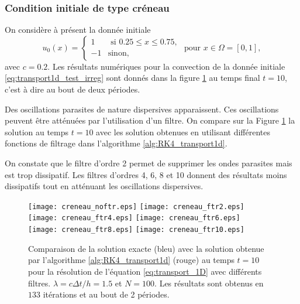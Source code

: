 \subsubsection{Condition initiale de type créneau}

On considère à présent la donnée initiale
\begin{equation}
u_0(x) = \left\lbrace
\begin{array}{rl}
1 & \text{ si } 0.25 \leq x \leq 0.75, \\
-1 & \text{sinon,}
\end{array}
\right.
\text{ pour } x \in \Omega = [0,1],
\label{eq:transport1d_test_irreg}
\end{equation}
avec $c=0.2$. Les résultats numériques pour la convection de la donnée initiale \eqref{eq:transport1d_test_irreg} sont donnés dans la figure \ref{fig:comp_ireg} au temps final $t=10$, c'est à dire au bout de deux périodes.

Des oscillations parasites de nature dispersives apparaissent. Ces oscillations peuvent être atténuées par l'utilisation d'un filtre. On compare sur la Figure \ref{fig:comp_ireg} la solution au temps $t=10$ avec les solution obtenues en utilisant différentes fonctions de filtrage dans l'algorithme \ref{alg:RK4_transport1d}.

On constate que le filtre d'ordre 2 permet de supprimer les ondes parasites mais est trop dissipatif. Les filtres d'ordres 4, 6, 8 et 10 donnent des résultats moins dissipatifs tout en atténuant les oscillations dispersives.

\begin{figure}[htbp]
\begin{center}
\texttt{[image: creneau\_noftr.eps]}
\texttt{[image: creneau\_ftr2.eps]}\\
\texttt{[image: creneau\_ftr4.eps]}
\texttt{[image: creneau\_ftr6.eps]}\\
\texttt{[image: creneau\_ftr8.eps]}
\texttt{[image: creneau\_ftr10.eps]}\\
\end{center}
\caption{Comparaison de la solution exacte (bleu) avec la solution obtenue par l'algorithme \ref{alg:RK4_transport1d} (rouge) au temps $t=10$ pour la résolution de l'équation \eqref{eq:transport_1D} avec différents filtres. $\lambda = c \Delta t / h = 1.5$ et $N=100$. Les résultats sont obtenus en $133$ itérations et au bout de 2 périodes.}
\label{fig:comp_ireg}
\end{figure}

